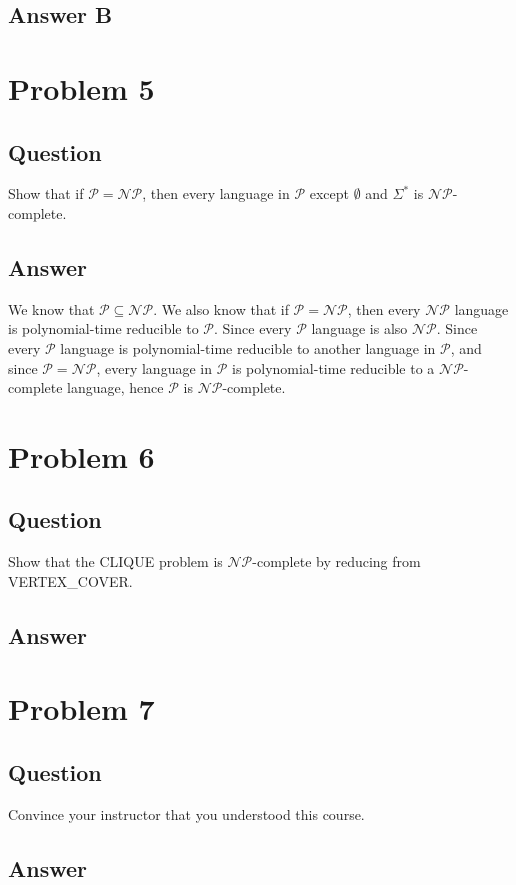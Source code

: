 \documentclass[12pt, a4paper]{article}
\begin{document}
\subsection{Answer B}


\section{Problem 5}
\subsection{Question}
Show that if $\mathcal{P=NP}$, then every language in $\mathcal{P}$ except $\emptyset$ and $\Sigma^{*}$ is $\mathcal{NP}$-complete.
\subsection{Answer}
We know that $\mathcal{P} \subseteq \mathcal{NP}$. We also know that if $\mathcal{P}=\mathcal{NP}$, then every $\mathcal{NP}$ language is polynomial-time reducible to $\mathcal{P}$. Since every $\mathcal{P}$ language is also $\mathcal{NP}$. Since every $\mathcal{P}$ language is polynomial-time reducible to another language in $\mathcal{P}$, and since $\mathcal{P}=\mathcal{NP}$, every language in $\mathcal{P}$ is polynomial-time reducible to a $\mathcal{NP}$-complete language, hence $\mathcal{P}$ is $\mathcal{NP}$-complete.

\section{Problem 6}
\subsection{Question}
Show that the CLIQUE problem is $\mathcal{NP}$-complete by reducing from VERTEX\_COVER.
\subsection{Answer}

\section{Problem 7}
\subsection{Question}
Convince your instructor that you understood this course.
\subsection{Answer}
\end{document}
